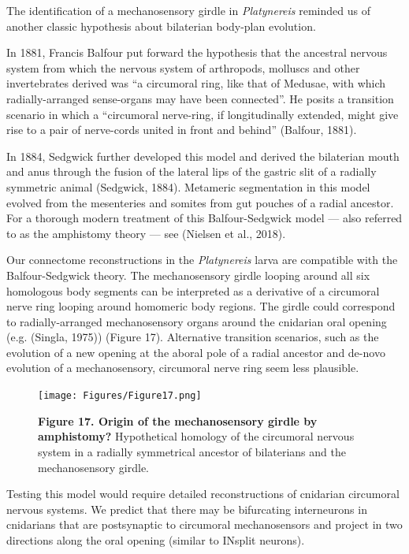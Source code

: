 \documentclass[
  11pt,
]{article}
\begin{document}
The identification of a mechanosensory girdle in \emph{Platynereis}
reminded us of another classic hypothesis about bilaterian body-plan
evolution.

In 1881, Francis Balfour put forward the hypothesis that the ancestral
nervous system from which the nervous system of arthropods, molluscs and
other invertebrates derived was ``a circumoral ring, like that of
Medusae, with which radially-arranged sense-organs may have been
connected''. He posits a transition scenario in which a ``circumoral
nerve-ring, if longitudinally extended, might give rise to a pair of
nerve-cords united in front and behind'' (Balfour, 1881).

In 1884, Sedgwick further developed this model and derived the
bilaterian mouth and anus through the fusion of the lateral lips of the
gastric slit of a radially symmetric animal (Sedgwick, 1884). Metameric
segmentation in this model evolved from the mesenteries and somites from
gut pouches of a radial ancestor. For a thorough modern treatment of
this Balfour-Sedgwick model --- also referred to as the amphistomy
theory --- see (Nielsen et al., 2018).

Our connectome reconstructions in the \emph{Platynereis} larva are
compatible with the Balfour-Sedgwick theory. The mechanosensory girdle
looping around all six homologous body segments can be interpreted as a
derivative of a circumoral nerve ring looping around homomeric body
regions. The girdle could correspond to radially-arranged mechanosensory
organs around the cnidarian oral opening (e.g. (Singla, 1975)) (Figure
17). Alternative transition scenarios, such as the evolution of a new
opening at the aboral pole of a radial ancestor and de-novo evolution of
a mechanosensory, circumoral nerve ring seem less plausible.

\begin{figure}[H]

{\centering \texttt{[image: Figures/Figure17.png]}

}

\caption{\textbf{Figure 17. Origin of the mechanosensory girdle by
amphistomy?} Hypothetical homology of the circumoral nervous system in a
radially symmetrical ancestor of bilaterians and the mechanosensory
girdle.}

\end{figure}%

Testing this model would require detailed reconstructions of cnidarian
circumoral nervous systems. We predict that there may be bifurcating
interneurons in cnidarians that are postsynaptic to circumoral
mechanosensors and project in two directions along the oral opening
(similar to INsplit neurons).
\end{document}

